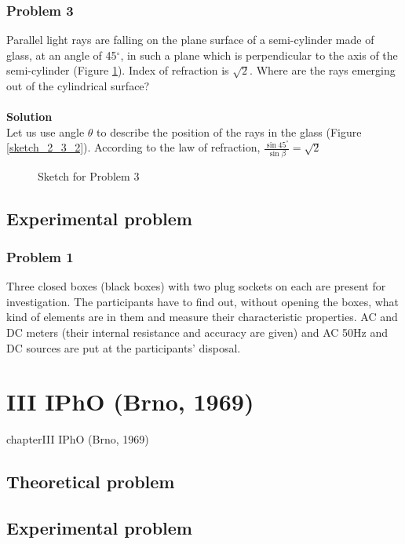 \documentclass[12pt,a4paper]{book}
\begin{document}
	\subsection*{Problem 3}
	Parallel light rays are falling on the plane surface of a semi-cylinder made of glass, at an angle of 45$^{\circ}$, in such a plane which is perpendicular to the axis of the semi-cylinder (Figure \ref{sketch_2_3_1}). Index of refraction is $\sqrt{2}$. Where are the rays emerging out of the cylindrical surface?\\ \\
	\textbf{Solution}\\
	Let us use angle $\theta$ to describe the position of the rays in the glass (Figure \ref{sketch_2_3_2}). According to the law of refraction, $\frac{\sin 45^{\circ}}{\sin \beta}=\sqrt{2}$
	\begin{figure}[!hbtp]
		\centering
		\caption{Sketch for Problem 3}
		\label{sketch_2_3_1}
	\end{figure}
\section*{Experimental problem}
	\subsection*{Problem 1}
	Three closed boxes (black boxes) with two plug sockets on each are present for investigation. The participants have to f\mbox{}ind out, without opening the boxes, what kind of elements are in them and measure their characteristic properties. AC and DC meters (their internal resistance and accuracy are given) and AC 50Hz and DC sources are put at the participants' disposal.
\chapter*{III IPhO (Brno, 1969)}
{chapter}{III IPhO (Brno, 1969)}
\section*{Theoretical problem}
	
\section*{Experimental problem}
\end{document}
